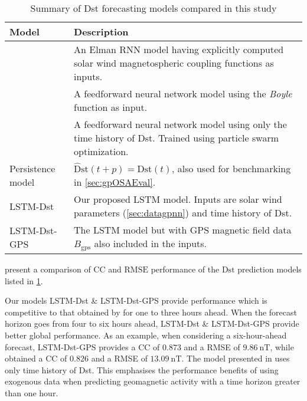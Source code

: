 \begin{table}[ht]
	\centering
	\caption{Summary of Dst forecasting models compared in this study}
	\label{table:competingmodels}
	\begin{tabular}{ l  p{} }
		\hline
		\textbf{Model} & \textbf{Description}\\
		\hline
		\citet{wu1997geomagnetic} & An Elman RNN model having explicitly computed solar wind magnetospheric 
		coupling functions as inputs.\\
		\citet{Bala2012} & A feedforward neural network model using the \emph{Boyle} function as input.\\
		\citet{Lazzus} & A feedforward neural network model using only the time history of Dst. Trained using 
		particle swarm optimization.\\
		Persistence model & $\mathrm{\hat{D}st}(t + p) = \mathrm{Dst}(t)$, also used for benchmarking in 
		\cref{sec:gpOSAEval}.\\
		LSTM-Dst & Our proposed LSTM model. Inputs are solar wind parameters (\cref{sec:datagpnn}) 
		and time history of Dst.\\
		LSTM-Dst-GPS & The LSTM model but with GPS magnetic field data $B_{\text{gps}}$ also included in the inputs. \\
		\hline
	\end{tabular}
\end{table}

 present a comparison of $\mathrm{CC}$ and $\mathrm{RMSE}$ performance 
of the $\mathrm{Dst}$ prediction models listed in \cref{table:competingmodels}. 

Our models LSTM-Dst \& LSTM-Dst-GPS provide performance which is competitive to that obtained by 
\citet{Lazzus} for one to three hours ahead. When the forecast horizon goes from four to six hours 
ahead, LSTM-Dst \& LSTM-Dst-GPS provide better global performance. As an example, when considering 
a six-hour-ahead forecast, LSTM-Dst-GPS provides a CC of $0.873$ and a RMSE of 
$\SI{9.86}{\nano\tesla}$, while \citet{Lazzus} obtained a CC of $0.826$ and a RMSE of 
$\SI{13.09}{\nano\tesla}$. The model presented in \citet{Lazzus} uses only time history of Dst. 
This emphasises the performance benefits of using exogenous data when predicting geomagnetic 
activity with a time horizon greater than one hour. 

